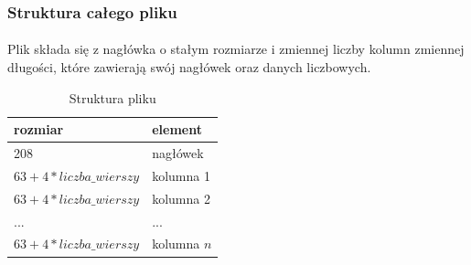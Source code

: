 \documentclass[12pt]{report}
\begin{document}
	\subsubsection{Struktura całego pliku}
	\paragraph{}
	Plik składa się z nagłówka o stałym rozmiarze i zmiennej liczby kolumn zmiennej długości, które zawierają swój nagłówek oraz danych liczbowych.
	
	\begin{table}[H]
		\centering
		\caption{Struktura pliku}
		\begin{tabular}{|p{5cm}|p{4cm}|} \hline
			rozmiar  & element \\\hline
			\hline
			208 & nagłówek  \\\hline
			$63+4*liczba\_wierszy$  & kolumna 1 \\\hline
			$63+4*liczba\_wierszy$  & kolumna 2 \\\hline
			...  & ... \\\hline
			$63+4*liczba\_wierszy$  & kolumna $n$ \\\hline
		\end{tabular}
	\end{table}
	
\end{document}
